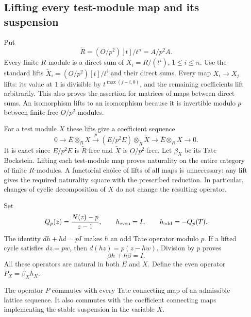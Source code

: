 \subsection{Lifting every test-module map and its suspension}

Put
\[
 \widetilde R=(O/p^2)[t]/t^n=A/p^2A.
\]
Every finite $R$-module is a direct sum of
$X_i=R/(t^i)$, $1\le i\le n$.  Use the standard lifts
$\widetilde X_i=(O/p^2)[t]/t^i$ and their direct sums.
Every map $X_i\to X_j$ lifts: its value at $1$ is divisible
by $t^{\max(j-i,0)}$, and the remaining coefficients lift
arbitrarily.  This also proves the assertion for matrices
of maps between direct sums.  An isomorphism lifts to an
isomorphism because it is invertible modulo $p$ between
finite free $O/p^2$-modules.

For a test module $X$ these lifts give a coefficient sequence
\[
 0\longrightarrow\overline E\otimes_R X
 \xrightarrow{p}(E/p^2E)\otimes_{\widetilde R}\widetilde X
 \longrightarrow\overline E\otimes_R X\longrightarrow0.
\]
It is exact since $E/p^2E$ is $\widetilde R$-free and
$\widetilde X$ is $O/p^2$-free.  Let $\beta_X$ be its Tate
Bockstein.  Lifting each test-module map proves naturality
on the entire category of finite $R$-modules.  A functorial
choice of lifts of all maps is unnecessary: any lift gives
the required naturality square with the prescribed reduction.
In particular, changes of cyclic decomposition of $X$
do not change the resulting operator.

Set
\[
 Q_p(z)=\frac{N(z)-p}{z-1},\qquad
 h_{\rm even}=I,\qquad h_{\rm odd}=-Q_p(T).
\]
The identity $dh+hd=pI$ makes $h$ an odd Tate operator modulo
$p$.  If a lifted cycle satisfies $dz=pw$, then
$d(hz)=p(z-hw)$.  Division by $p$ proves
\begin{equation}\label{eq:binomial-all-beta-h}
 \beta h+h\beta=I.
\end{equation}
All these operators are natural in both $E$ and $X$.
Define the even operator $P_X=\beta_Xh_X$.

\begin{lemma}\label{lem:binomial-all-boundaries}
The operator $P$ commutes with every Tate connecting map of
an admissible lattice sequence.  It also commutes with the
coefficient connecting maps implementing the stable suspension
in the variable $X$.
\end{lemma}

